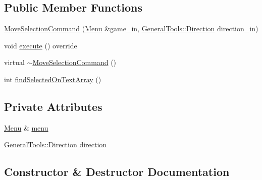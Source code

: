 \subsection*{Public Member Functions}
\begin{DoxyCompactItemize}
\item 
\hyperlink{class_move_selection_command_a8196ac5774ee0d0c5386ba256d1cc0e8}{Move\+Selection\+Command} (\hyperlink{class_menu}{Menu} \&game\+\_\+in, \hyperlink{namespace_general_tools_afedc3bd242369903830dec92c3ad569b}{General\+Tools\+::\+Direction} direction\+\_\+in)
\item 
void \hyperlink{class_move_selection_command_a0d2117e50adfe980744b3ca883ca7fc5}{execute} () override
\item 
virtual \hyperlink{class_move_selection_command_ae014898c6e01dd18668f79fd96d9b670}{$\sim$\+Move\+Selection\+Command} ()
\item 
int \hyperlink{class_move_selection_command_a6a9d0bed09292f4465c3a09a847ed0be}{find\+Selected\+On\+Text\+Array} ()
\end{DoxyCompactItemize}
\subsection*{Private Attributes}
\begin{DoxyCompactItemize}
\item 
\hyperlink{class_menu}{Menu} \& \hyperlink{class_move_selection_command_a744230c9fb6c308c2f05a08d7c45e4c2}{menu}
\item 
\hyperlink{namespace_general_tools_afedc3bd242369903830dec92c3ad569b}{General\+Tools\+::\+Direction} \hyperlink{class_move_selection_command_a27a2a41486ddb096f3a1f350395ea0ea}{direction}
\end{DoxyCompactItemize}


\subsection{Constructor \& Destructor Documentation}
\hypertarget{class_move_selection_command_a8196ac5774ee0d0c5386ba256d1cc0e8}{}
